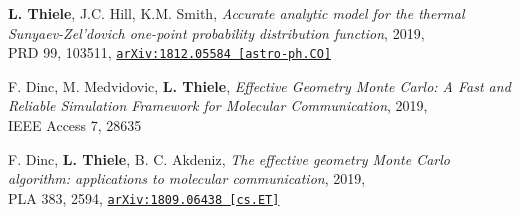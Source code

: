 {\bf L. Thiele}, J.C. Hill, K.M. Smith, \emph{Accurate analytic model for the thermal
Sunyaev-Zel'dovich one-point probability distribution function}, 2019,\\
PRD 99, 103511,
\href{https://arxiv.org/abs/1812.05584}{\mbox{\texttt{arXiv:1812.05584 [astro-ph.CO]}}}

F. Dinc, M. Medvidovic, {\bf L. Thiele}, \emph{Effective Geometry Monte Carlo: A Fast and
Reliable Simulation Framework for Molecular Communication}, 2019,\\
IEEE Access 7, 28635

F. Dinc, {\bf L. Thiele}, B. C. Akdeniz, \emph{The effective geometry Monte Carlo
algorithm: applications to molecular communication}, 2019,\\
PLA 383, 2594,
\href{https://arxiv.org/abs/1809.06438}{\mbox{\texttt{arXiv:1809.06438 [cs.ET]}}}
